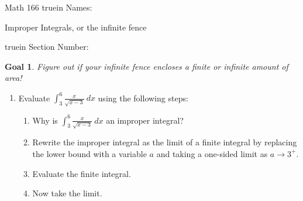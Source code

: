 \documentclass[12pt]{article}
\newtheorem*{goal}{Goal}
\begin{document}
\pagestyle{empty} %

\noindent
{Math 166  truein  Names:\ \hrulefill}

\noindent
{Improper Integrals, or the infinite fence}

\noindent  {} truein  Section Number:\ \hrulefill
\medskip

\begin{goal} \rm
Figure out if your infinite fence encloses a finite or infinite amount of area!
\end{goal}

\begin{enumerate}

\item Evaluate $\displaystyle\int_3^6 \displaystyle\frac{x}{\sqrt{x-3}} \ dx$ using the following steps:
\begin{enumerate}
\item Why is $\displaystyle\int_3^6 \displaystyle\frac{x}{\sqrt{x-3}} \ dx$ an improper integral?

\bigskip

\bigskip

\bigskip


\item Rewrite the improper integral as the limit of a finite integral by replacing the lower bound with a variable $a$ and taking a one-sided limit as $a \to 3^+$.

\bigskip

\bigskip

\bigskip

\bigskip

\item Evaluate the finite integral. 

\bigskip

\bigskip

\bigskip

\bigskip

\bigskip

\bigskip

\bigskip

\bigskip

\item Now take the limit.

\bigskip

\bigskip

\bigskip

\bigskip



\end{enumerate}
\end{enumerate}
\end{document}
